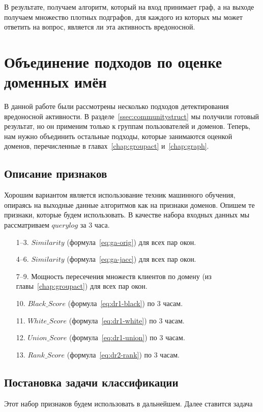 \documentclass[a4paper,14pt]{extreport} %
\begin{document}
В результате, получаем алгоритм, который на вход принимает граф, а на выходе получаем множество плотных подграфов, для каждого из которых мы может ответить на вопрос, является ли эта активность вредоносной.
	
\chapter{Объединение подходов по оценке доменных имён}
\label{chap:union-all}
В данной работе были рассмотрены несколько подходов детектирования вредоносной активности. В разделе~\ref{ssec:communitystruct} мы получили готовый результат, но он применим только к группам пользователей и доменов. Теперь, нам нужно объединить остальные подходы, которые занимаются оценкой доменов, перечисленные в главах~\ref{chap:groupact} и~\ref{chap:graph}.
	
\section{Описание признаков}
\label{sec:desc-features}
Хорошим вариантом является использование техник машинного обучения, опираясь на выходные данные алгоритмов как на признаки доменов. Опишем те признаки, которые будем использовать. В качестве набора входных данных мы рассматриваем $querylog$ за 3 часа.
\begin{enumerate}
	\item [1--3.] $Similarity$ (формула~\eqref{eq:ga-orig}) для всех пар окон.
	\item [4--6.]$Similarity$ (формула~\eqref{eq:ga-jacc}) для всех пар окон.
	\item [7--9.] Мощность пересечения множеств клиентов по домену (из главы~\ref{chap:groupact}) для всех пар окон.
	\item [10.] $Black\_Score$ (формула~\eqref{eq:dr1-black}) по 3 часам.
	\item [11.] $White\_Score$ (формула~\eqref{eq:dr1-white}) по 3 часам.
	\item [12.] $Union\_Score$ (формула~\eqref{eq:dr1-union}) по 3 часам.
	\item [13.] $Rank\_Score$ (формула~\eqref{eq:dr2-rank}) по 3 часам.
	      	      		
\end{enumerate}
\section{Постановка задачи классификации}
Этот набор признаков будем использовать в дальнейшем. Далее ставится задача
	
\end{document}
